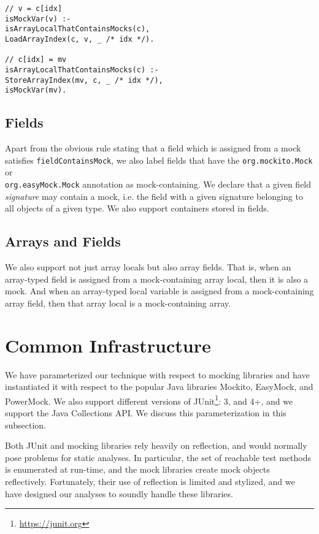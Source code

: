 \begin{lstlisting}[basicstyle=\ttfamily\small,numbers=none]
// v = c[idx]
isMockVar(v) :-
isArrayLocalThatContainsMocks(c),
LoadArrayIndex(c, v, _ /* idx */).

// c[idx] = mv
isArrayLocalThatContainsMocks(c) :-
StoreArrayIndex(mv, c, _ /* idx */),
isMockVar(mv).
\end{lstlisting}

\subsection{Fields} 

Apart from the obvious rule stating that a field which is assigned from a mock satisfies {\tt fieldContainsMock}, we also label fields that have the {\tt org.mockito.Mock} or \\ {\tt org.easyMock.Mock} annotation as mock-containing. We declare that a given field \emph{signature} may contain a mock, i.e. the field with a given signature belonging to all objects of a given type. We also support containers stored in fields.

\subsection{Arrays and Fields} 

We also support not just array locals but also array fields. That is, when an array-typed field is assigned from a mock-containing array local, then it is also a mock. And when an array-typed local variable is assigned from a mock-containing array field, then that array local is a mock-containing array.

\section{Common Infrastructure}
\label{sec:common}
We have parameterized our technique with respect to mocking libraries and have instantiated it with respect to the popular Java libraries Mockito, EasyMock, and PowerMock. We also support different versions of JUnit\footnote{\url{https://junit.org}}: 3, and 4+, and we support the Java Collections API. We discuss this parameterization in this subsection.

Both JUnit and mocking libraries rely heavily on reflection, and would normally pose problems for static analyses. In particular, the set of reachable test methods is enumerated at run-time, and the mock libraries create mock objects reflectively. Fortunately, their use of reflection is limited and stylized, and we have designed our analyses to soundly handle these libraries.


